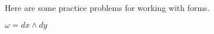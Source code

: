 \documentclass[12pt]{article}
\begin{document}
Here are some practice problems for working with forms.

$\omega = dx \wedge dy$
\end{document}
